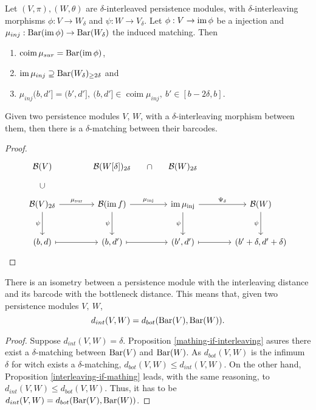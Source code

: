 \begin{lemma}
    Let $ (V, \pi), (W, \theta) $ are $\delta$-interleaved persistence modules, with $\delta$-interleaving morphisms $ \phi: V \to W_\delta $ and $ \psi: W \to V_\delta $. Let $ \phi: V \to \operatorname{im}\phi $ be a injection and $ \mu_{inj}: \operatorname{Bar}(\operatorname{im} \phi) \to \operatorname{Bar} (W_\delta)$ the induced matching. Then
    \begin{enumerate}
        \item $\operatorname{coim} \mu_{sur} = \operatorname{Bar} (\operatorname{im} \phi) $,
        \item $ \operatorname{im} \mu_{inj} \supseteq \operatorname{Bar} (W_\delta)_{\geq 2\delta} $ and
        \item $ \mu_{inj}(b, d'] = (b', d'], \ (b, d'] \in \operatorname{coim} \mu_{inj}, \ b' \in [b-2\delta, b]$.
    \end{enumerate}
\end{lemma}

\begin{proposition}\label{mathing-if-interleaving}
    Given two persistence modules $ V $, $ W $, with a $\delta$-interleaving morphism between them, then there is a $ \delta$-matching between their barcodes.
\end{proposition}
\begin{proof}
    $$
    \begin{tikzcd}[column sep=large, row sep=large]
        \mathcal{B}(V) & \mathcal{B}(W[\delta])_{2\delta} \arrow[r, phantom, "\cap"] & \mathcal{B}(W)_{2\delta} \\
        \mathcal{B}(V)_{2\delta} \arrow[u, phantom, "\cup"] \arrow[r, "\mu_{\text{sur}}"] \arrow[d, "\psi"'] & \mathcal{B}(\mathrm{im}\,f) \arrow[r, "\mu_{\text{inj}}"] \arrow[d, "\psi"'] & \mathrm{im}\,\mu_{\text{inj}} \arrow[r, "\Psi_\delta"] \arrow[d, "\psi"'] & \mathcal{B}(W) \arrow[d, "\psi"'] \\
        (b, d) \arrow[r, mapsto] & (b, d') \arrow[r, mapsto] & (b', d') \arrow[r, mapsto] & (b' + \delta, d' + \delta)
    \end{tikzcd}
    $$
\end{proof}

\begin{theorem}[Stability]
    There is an isometry between a persistence module with the interleaving distance and its barcode with the bottleneck distance. This means that, given two persistence modules $ V, \ W $, 
    $$ 
        d_{int} (V, W) = d_{bot} (\operatorname{Bar}(V), \operatorname{Bar}(W)).
    $$
\end{theorem}
\begin{proof}
    Suppose $ d_{int}(V, W) = \delta $. Proposition \ref{mathing-if-interleaving} asures there exist a $\delta$-matching between $ \operatorname{Bar}(V) $ and $ \operatorname{Bar} (W) $. As $ d_{bot}(V, W) $ is the infimum $\delta$ for witch exists a $\delta$-matching, $ d_{bot}(V, W) \leq d_{int}(V, W)$. On the other hand, Proposition \ref{interleaving-if-mathing} leads, with the same reasoning, to $ d_{int}(V, W) \leq d_{bot}(V, W)$. Thus, it has to be $ d_{int} (V, W) = d_{bot} (\operatorname{Bar}(V), \operatorname{Bar}(W)) $.
\end{proof}
